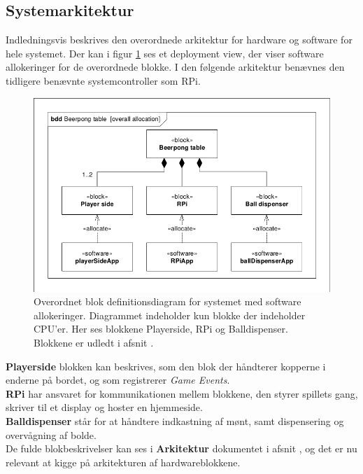 \documentclass[Rapport/Rapport_main.tex]{subfiles}
\begin{document}
\subsection{Systemarkitektur}
Indledningsvis beskrives den overordnede arkitektur for hardware og software for hele systemet. Der kan i figur \ref{fig:rap_systemarkitektur} ses et deployment view, der viser software allokeringer for de overordnede blokke. I den følgende arkitektur benævnes den tidligere benævnte systemcontroller som RPi.
\begin{figure}[H]
    \centering
    \includegraphics[width=1\textwidth,trim={0.24in 0.24in 0.24in 0.24in},clip, page=1]{Arkitektur/graphics/BDD_og_IBD.pdf}
    \caption{Overordnet blok definitionsdiagram for systemet med software allokeringer. Diagrammet indeholder kun blokke der indeholder CPU'er. Her ses blokkene Playerside, RPi og Balldispenser. Blokkene er udledt i afsnit .}
    \label{fig:rap_systemarkitektur}
\end{figure}
\textbf{Playerside} blokken kan beskrives, som den blok der håndterer kopperne i enderne på bordet, og som registrerer \textit{Game Events}.\\
\textbf{RPi} har ansvaret for kommunikationen mellem blokkene, den styrer spillets gang, skriver til et display og hoster en hjemmeside.\\
\textbf{Balldispenser} står for at håndtere indkastning af mønt, samt dispensering og overvågning af bolde.\\
De fulde blokbeskrivelser kan ses i \textbf{Arkitektur} dokumentet i afsnit , og det er nu relevant at kigge på arkitekturen af hardwareblokkene.
\end{document}
